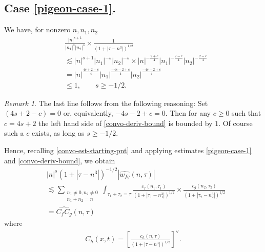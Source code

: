 \documentclass[12pt,reqno]{amsart}
\numberwithin{equation}{section}  %
\numberwithin{figure}{section}
\newcommand{\wh}{\widehat}
\theoremstyle{plain}
\theoremstyle{definition}
\theoremstyle{remark}
\newtheorem{remark}{Remark}
\begin{document}
\subsection{Case \eqref{pigeon-case-1}.} 
We have, for nonzero $ n, n_1, n_2 $
%
\begin{equation}
	\label{convo-deriv-bound}
	\begin{split}
		& \frac{|n|^{s+1}}{|n_1|^s 
		| n_2|^s}
		\times
		\frac{1}{(1 + | \tau -n^{3} |)^{1/2}}
		\\
		& \lesssim | n |^{s+1}| n_1 |^{-s}| n_2 |^{-s} \times | n
		|^{-\frac{2+c}{4}}| n_1 |^{-\frac{2-c}{4}}| n_2 |^{-\frac{2-c}{4}} 
		\\
		& = | n |^{\frac{4s +2 -c}{4}} | n_1 |^{\frac{-4s -2 +c}{4}} | n_2
		|^{\frac{-4s -2 +c}{4}}
		\\
		& \le 1, \qquad s \ge -1/2.
	\end{split}  
\end{equation}
%
%
\begin{remark}
	\label{rem:s-val}
	The last line follows from the following reasoning: Set $(4s + 2 -c) = 0$
or, equivalently, $-4s -2 +c = 0$. Then for any $c \ge 0$ such that $c = 4s+2$
the left hand side of
\eqref{convo-deriv-bound} is bounded by $1$. Of course such a $c$ exists, as long as $s \ge -1/2$. 
\end{remark}
%
%
%
Hence, recalling \eqref{convo-est-starting-pnt} and applying estimates 
\eqref{pigeon-case-1} and \eqref{convo-deriv-bound}, we obtain
%
%
\begin{equation}
	\label{non-lin-rep-with-bound}
	\begin{split}
		& |n|^s \left( 1 + | \tau - n^3 | \right)^{-1/2} | 
		\wh{w_{fg}}(n, \tau) | 
		\\
		& \lesssim \sum_{\substack{n_1 \neq0, n_2 \neq 0 \\n_1 + n_2 =n}} \int_{\tau_1 + \tau_2 = \tau}\frac{c_f(n_1, \tau_1)}{\left( 1 + | 
		\tau_1 -  n_1^3| \right)^{1/2}}
		\times \frac{c_g\left( n_2, \tau_2\right)}{\left( 1 + | \tau_2 -n_2^3|
		\right)^{1/2}}
		\\
		& = \wh{C_f C_g}(n, \tau)
	\end{split}
\end{equation}
%
%
where
\begin{equation*}
	\begin{split}
		C_h(x,t) =
		\left[ \frac{c_h(n, \tau)}{\left( 1 + | \tau - n^3 | 
		\right)^{1/2}}\right]^\vee .	
	\end{split}
\end{equation*}
\end{document}
